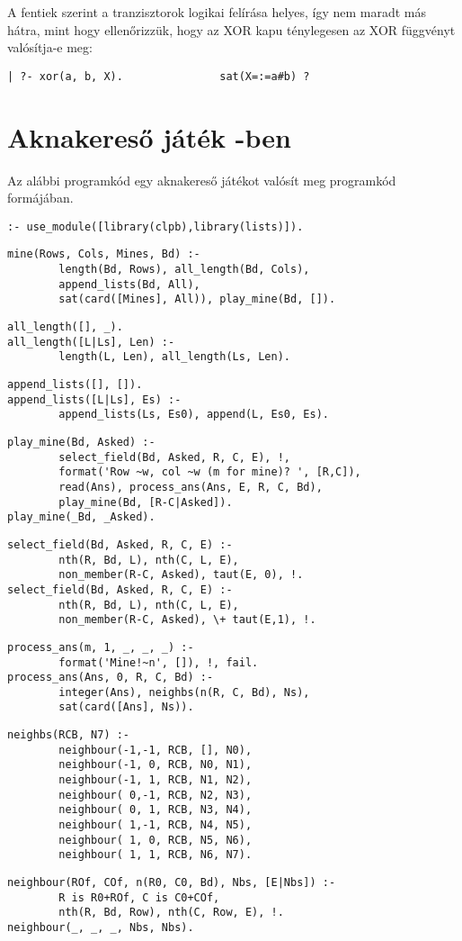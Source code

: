 A fentiek szerint a tranzisztorok logikai felírása helyes, így nem
maradt más hátra, mint hogy ellenőrizzük, hogy az XOR kapu ténylegesen
az XOR függvényt valósítja-e meg:

\begin{verbatim}
| ?- xor(a, b, X).               sat(X=:=a#b) ?
\end{verbatim}

\section{Aknakereső játék \Clpb -ben}

Az alábbi programkód egy aknakereső játékot valósít meg \clpb programkód
formájában.

\begin{verbatim}
:- use_module([library(clpb),library(lists)]).
\end{verbatim}
\begin{verbatim}
mine(Rows, Cols, Mines, Bd) :-
        length(Bd, Rows), all_length(Bd, Cols), 
        append_lists(Bd, All),
        sat(card([Mines], All)), play_mine(Bd, []).
\end{verbatim}
\begin{verbatim}
all_length([], _).
all_length([L|Ls], Len) :- 
        length(L, Len), all_length(Ls, Len).
\end{verbatim}
\begin{verbatim}
append_lists([], []).
append_lists([L|Ls], Es) :-
        append_lists(Ls, Es0), append(L, Es0, Es).
\end{verbatim}
\begin{verbatim}
play_mine(Bd, Asked) :- 
        select_field(Bd, Asked, R, C, E), !,
        format('Row ~w, col ~w (m for mine)? ', [R,C]), 
        read(Ans), process_ans(Ans, E, R, C, Bd), 
        play_mine(Bd, [R-C|Asked]).
play_mine(_Bd, _Asked).
\end{verbatim}
\begin{verbatim}
select_field(Bd, Asked, R, C, E) :-
        nth(R, Bd, L), nth(C, L, E), 
        non_member(R-C, Asked), taut(E, 0), !.
select_field(Bd, Asked, R, C, E) :-
        nth(R, Bd, L), nth(C, L, E), 
        non_member(R-C, Asked), \+ taut(E,1), !.
\end{verbatim}
\begin{verbatim}
process_ans(m, 1, _, _, _) :- 
        format('Mine!~n', []), !, fail.
process_ans(Ans, 0, R, C, Bd) :-
        integer(Ans), neighbs(n(R, C, Bd), Ns), 
        sat(card([Ans], Ns)).
\end{verbatim}
\begin{verbatim}
neighbs(RCB, N7) :-
        neighbour(-1,-1, RCB, [], N0), 
        neighbour(-1, 0, RCB, N0, N1),
        neighbour(-1, 1, RCB, N1, N2), 
        neighbour( 0,-1, RCB, N2, N3),
        neighbour( 0, 1, RCB, N3, N4), 
        neighbour( 1,-1, RCB, N4, N5),
        neighbour( 1, 0, RCB, N5, N6), 
        neighbour( 1, 1, RCB, N6, N7).
\end{verbatim}
\begin{verbatim}
neighbour(ROf, COf, n(R0, C0, Bd), Nbs, [E|Nbs]) :-
        R is R0+ROf, C is C0+COf, 
        nth(R, Bd, Row), nth(C, Row, E), !.
neighbour(_, _, _, Nbs, Nbs).
\end{verbatim}

